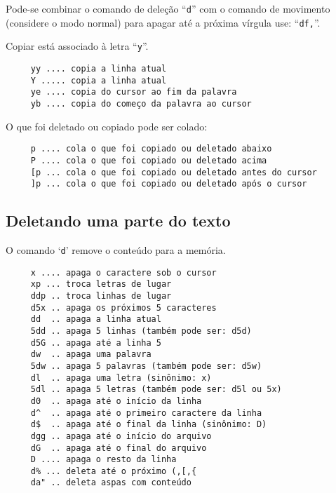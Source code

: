 
{\Large {}} Pode-se combinar o comando de deleção ``\verb+d+'' com o
comando de movimento (considere o modo normal) para apagar até a
próxima vírgula use: ``\verb+df,+''. 

Copiar está associado à letra ``\verb|y|''.

\begin{verbatim}
     yy .... copia a linha atual
     Y ..... copia a linha atual
     ye .... copia do cursor ao fim da palavra
     yb .... copia do começo da palavra ao cursor
\end{verbatim}

O que foi deletado ou copiado pode ser colado:
\begin{verbatim}
     p .... cola o que foi copiado ou deletado abaixo
     P .... cola o que foi copiado ou deletado acima
     [p ... cola o que foi copiado ou deletado antes do cursor
     ]p ... cola o que foi copiado ou deletado após o cursor
\end{verbatim}

\subsection{Deletando uma parte do texto}\label{Deletando uma parte do texto}

O comando `{\tt d}' remove o conteúdo para a memória.

\begin{verbatim}
     x .... apaga o caractere sob o cursor
     xp ... troca letras de lugar
     ddp .. troca linhas de lugar
     d5x .. apaga os próximos 5 caracteres
     dd  .. apaga a linha atual
     5dd .. apaga 5 linhas (também pode ser: d5d)
     d5G .. apaga até a linha 5
     dw  .. apaga uma palavra
     5dw .. apaga 5 palavras (também pode ser: d5w)
     dl  .. apaga uma letra (sinônimo: x)
     5dl .. apaga 5 letras (também pode ser: d5l ou 5x)
     d0  .. apaga até o início da linha
     d^  .. apaga até o primeiro caractere da linha
     d$  .. apaga até o final da linha (sinônimo: D)
     dgg .. apaga até o início do arquivo
     dG  .. apaga até o final do arquivo
     D .... apaga o resto da linha
     d% ... deleta até o próximo (,[,{
     da" .. deleta aspas com conteúdo
\end{verbatim}

